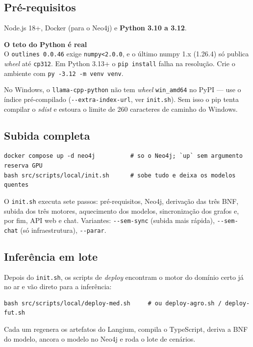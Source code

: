 \documentclass[11pt,a4paper]{article}
\newcommand{\aviso}[2]{%
  \begin{center}
  \begin{minipage}{0.95\linewidth}
  \setlength{\fboxsep}{8pt}%
  \colorbox{corAlertaFundo}{%
    \begin{minipage}{\dimexpr\linewidth-16pt\relax}
    \textbf{\textcolor{corAlerta}{#1}}\\[2pt]#2
    \end{minipage}}
  \end{minipage}
  \end{center}
}
\newcommand{\arq}[1]{\texttt{\small #1}}
\begin{document}
\subsection{Pré-requisitos}

Node.js 18+, Docker (para o Neo4j) e \textbf{Python 3.10 a 3.12}.

\aviso{O teto do Python é real}{%
O \texttt{outlines 0.0.46} exige \texttt{numpy<2.0.0}, e o último numpy 1.x
(1.26.4) só publica \emph{wheel} até \texttt{cp312}. Em Python 3.13+ o
\texttt{pip install} falha na resolução. Crie o ambiente com
\texttt{py -3.12 -m venv venv}.

No Windows, o \texttt{llama-cpp-python} não tem \emph{wheel} \texttt{win\_amd64}
no PyPI --- use o índice pré-compilado
(\texttt{-{}-extra-index-url}, ver \arq{init.sh}). Sem isso o pip tenta compilar o
\emph{sdist} e estoura o limite de 260 caracteres de caminho do Windows.}

\subsection{Subida completa}

\begin{lstlisting}
docker compose up -d neo4j          # so o Neo4j; `up` sem argumento reserva GPU
bash src/scripts/local/init.sh      # sobe tudo e deixa os modelos quentes
\end{lstlisting}

O \arq{init.sh} executa sete passos: pré-requisitos, Neo4j, derivação das três
BNF, subida dos três motores, aquecimento dos modelos, sincronização dos grafos
e, por fim, API web e chat. Variantes: \texttt{-{}-sem-sync} (subida mais rápida),
\texttt{-{}-sem-chat} (só infraestrutura), \texttt{-{}-parar}.

\subsection{Inferência em lote}

Depois do \arq{init.sh}, os scripts de \emph{deploy} encontram o motor do
domínio certo já no ar e vão direto para a inferência:

\begin{lstlisting}
bash src/scripts/local/deploy-med.sh     # ou deploy-agro.sh / deploy-fut.sh
\end{lstlisting}

Cada um regenera os artefatos do Langium, compila o TypeScript, deriva a BNF do
modelo, ancora o modelo no Neo4j e roda o lote de cenários.
\end{document}
